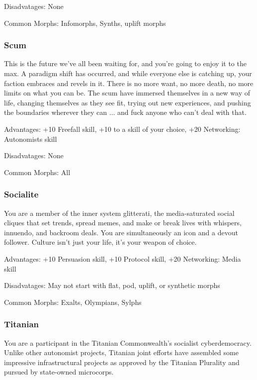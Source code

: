 Disadvatages: None 

Common Morphs: Infomorphs, Synths, uplift morphs 

\subsubsection{Scum} \label{sec:background-scum} 

This is the future we’ve all been waiting for, and you’re going to enjoy it to the max. A paradigm shift has occurred, and while everyone else is catching up, your faction embraces and revels in it. There is no more want, no more death, no more limits on what you can be. The scum have immersed themselves in a new way of life, changing themselves as they see fit, trying out new experiences, and pushing the boundaries wherever they can ... and fuck anyone who can’t deal with that. 

Advantages: +10 Freefall skill, +10 to a skill of your choice, +20 Networking: Autonomists skill 

Disadvatages: None 

Common Morphs: All 

\subsubsection{Socialite} \label{sec:socialite} You are a member of the inner system glitterati, the media-saturated social cliques that set trends, spread memes, and make or break lives with whispers, innuendo, and backroom deals. You are simultaneously an icon and a devout follower. Culture isn’t just your life, it’s your weapon of choice. 

Advantages: +10 Persuasion skill, +10 Protocol skill, +20 Networking: Media skill 

Disadvatages: May not start with flat, pod, uplift, or synthetic morphs 

Common Morphs: Exalts, Olympians, Sylphs 

\subsubsection{Titanian} \label{sec:titanian} 

You are a participant in the Titanian Commonwealth’s socialist cyberdemocracy. Unlike other autonomist projects, Titanian joint efforts have assembled some impressive infrastructural projects as approved by the Titanian Plurality and pursued by state-owned microcorps. 

